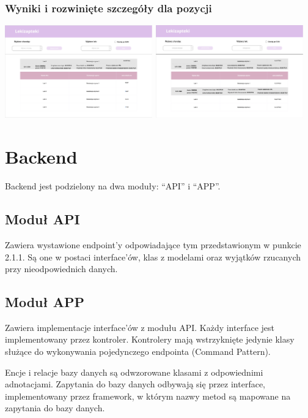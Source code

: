 \documentclass{article}
\begin{document}
      \subsubsection{Wyniki i rozwinięte szczegóły dla pozycji}
      \includegraphics[width=6.4cm, height=4cm]{lekizapteki-leki-identyczne}
      \includegraphics[width=6.4cm, height=4cm]{lekizapteki-leki-identyczne-rozwiniete}

  \section{Backend}
  Backend jest podzielony na dwa moduły: ``API'' i ``APP''.

    \subsection{Moduł API}
    Zawiera wystawione endpoint'y odpowiadające tym przedstawionym w punkcie 2.1.1.
    Są one w postaci interface'ów, klas z modelami oraz wyjątków rzucanych przy nieodpowiednich danych.

    \subsection{Moduł APP}
    Zawiera implementacje interface'ów z modułu API.
    Każdy interface jest implementowany przez kontroler.
    Kontrolery mają wstrzyknięte jedynie klasy służące do wykonywania pojedynczego endpointa (Command Pattern).

    Encje i relacje bazy danych są odwzorowane klasami z odpowiednimi adnotacjami.
    Zapytania do bazy danych odbywają się przez interface, implementowany przez framework,
    w którym nazwy metod są mapowane na zapytania do bazy danych.
\end{document}
